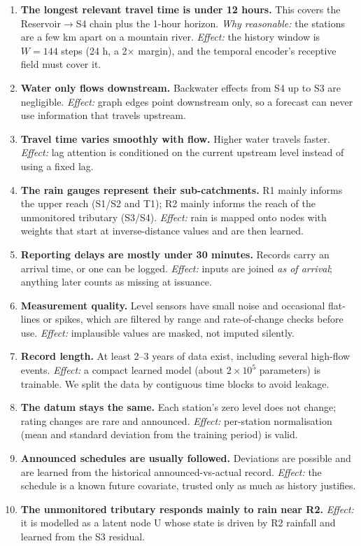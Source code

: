 \documentclass[11pt]{article}
\begin{document}
\begin{enumerate}[label=\textbf{A\arabic*}]
\item \textbf{The longest relevant travel time is under 12 hours.} This covers the Reservoir$\to$S4 chain plus the 1-hour horizon. \emph{Why reasonable:} the stations are a few km apart on a mountain river. \emph{Effect:} the history window is $W=144$ steps (24 h, a 2$\times$ margin), and the temporal encoder's receptive field must cover it.
\item \textbf{Water only flows downstream.} Backwater effects from S4 up to S3 are negligible. \emph{Effect:} graph edges point downstream only, so a forecast can never use information that travels upstream.
\item \textbf{Travel time varies smoothly with flow.} Higher water travels faster. \emph{Effect:} lag attention is conditioned on the current upstream level instead of using a fixed lag.
\item \textbf{The rain gauges represent their sub-catchments.} R1 mainly informs the upper reach (S1/S2 and T1); R2 mainly informs the reach of the unmonitored tributary (S3/S4). \emph{Effect:} rain is mapped onto nodes with weights that start at inverse-distance values and are then learned.
\item \textbf{Reporting delays are mostly under 30 minutes.} Records carry an arrival time, or one can be logged. \emph{Effect:} inputs are joined \emph{as of arrival}; anything later counts as missing at issuance.
\item \textbf{Measurement quality.} Level sensors have small noise and occasional flat-lines or spikes, which are filtered by range and rate-of-change checks before use. \emph{Effect:} implausible values are masked, not imputed silently.
\item \textbf{Record length.} At least 2--3 years of data exist, including several high-flow events. \emph{Effect:} a compact learned model (about $2\times10^5$ parameters) is trainable. We split the data by contiguous time blocks to avoid leakage.
\item \textbf{The datum stays the same.} Each station's zero level does not change; rating changes are rare and announced. \emph{Effect:} per-station normalisation (mean and standard deviation from the training period) is valid.
\item \textbf{Announced schedules are usually followed.} Deviations are possible and are learned from the historical announced-vs-actual record. \emph{Effect:} the schedule is a known future covariate, trusted only as much as history justifies.
\item \textbf{The unmonitored tributary responds mainly to rain near R2.} \emph{Effect:} it is modelled as a latent node U whose state is driven by R2 rainfall and learned from the S3 residual.
\end{enumerate}
\end{document}
